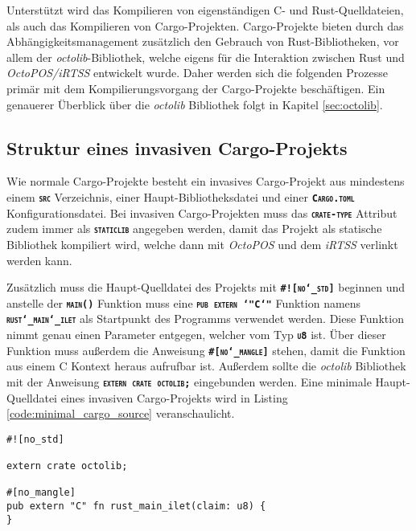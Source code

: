 
Unterstützt wird das Kompilieren von eigenständigen C- und Rust-Quelldateien, als auch das Kompilieren von
Cargo-Projekten. Cargo-Projekte bieten durch das Abhängigkeitsmanagement zusätzlich den Gebrauch
von Rust-Bibliotheken, vor allem der \textit{octolib}-Bibliothek,
welche eigens für die Interaktion zwischen Rust und \textit{OctoPOS/iRTSS}
entwickelt wurde.
Daher werden sich die folgenden Prozesse primär mit dem Kompilierungsvorgang der Cargo-Projekte
beschäftigen.
Ein genauerer Überblick über die \textit{octolib} Bibliothek folgt in Kapitel \ref{sec:octolib}.

\subsection{Struktur eines invasiven Cargo-Projekts}

Wie normale Cargo-Projekte besteht ein invasives Cargo-Projekt aus mindestens einem
\texttt{\textsc{\textbf{src}}} Verzeichnis, einer Haupt-Bibliotheksdatei
und einer \texttt{\textsc{\textbf{Cargo.toml}}} Konfigurationsdatei.
Bei invasiven Cargo-Projekten muss das \texttt{\textsc{\textbf{crate-type}}} Attribut zudem immer als
\texttt{\textsc{\textbf{staticlib}}} angegeben werden,
damit das Projekt als statische Bibliothek kompiliert wird, welche dann mit \textit{OctoPOS} und dem \textit{iRTSS} 
verlinkt werden kann.

Zusätzlich muss die Haupt-Quelldatei des Projekts mit \texttt{\textsc{\textbf{\#![no\char`_std]}}} beginnen und 
anstelle der \texttt{\textsc{\textbf{main()}}} Funktion muss eine
\texttt{\textsc{\textbf{pub extern \char`"C\char`"}}} Funktion namens
\texttt{\textsc{\textbf{rust\char`_main\char`_ilet}}} als Startpunkt des Programms verwendet werden.
Diese Funktion nimmt genau einen Parameter entgegen, welcher vom Typ \texttt{\textsc{\textbf{u8}}} ist.
Über dieser Funktion muss außerdem die Anweisung \texttt{\textsc{\textbf{\#[no\char`_mangle]}}} stehen,
damit die Funktion aus einem C Kontext heraus aufrufbar ist.
Außerdem sollte die \textit{octolib} Bibliothek mit der Anweisung \texttt{\textsc{\textbf{extern crate octolib;}}}
eingebunden werden. Eine minimale Haupt-Quelldatei eines invasiven Cargo-Projekts wird in Listing 
\ref{code:minimal_cargo_source} veranschaulicht.

\begin{lstlisting}[float,caption={
Eine minimale Haupt-Quelldatei eines invasiven Cargo-Projekts
},label=code:minimal_cargo_source]
#![no_std]

extern crate octolib;

#[no_mangle]
pub extern "C" fn rust_main_ilet(claim: u8) {
}
\end{lstlisting}

